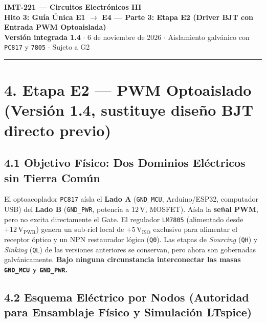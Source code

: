 \documentclass[10pt, a4paper, landscape]{article}
\begin{document}
\noindent
{\LARGE \textbf{\textcolor{ucbblue}{IMT-221 — Circuitos Electrónicos III}}}\\[0.12cm]
{\Large \textbf{Hito 3: Guía Única E1 $\rightarrow$ E4 — Parte 3: Etapa E2 (Driver BJT con Entrada PWM Optoaislada)}}\\[0.08cm]
{\small \textbf{Versión integrada 1.4} $\cdot$ 6 de noviembre de 2026 $\cdot$ Aislamiento galvánico con \texttt{PC817} y \texttt{7805} $\cdot$ Sujeto a G2}
\par\vspace{0.15cm}\noindent\rule{\linewidth}{0.4pt}\vspace{0.2cm}

\section*{4. Etapa E2 — PWM Optoaislado (Versión 1.4, sustituye diseño BJT directo previo)}

\subsection*{4.1 Objetivo Físico: Dos Dominios Eléctricos sin Tierra Común}
El optoacoplador \texttt{PC817} aísla el \textbf{Lado A} (\texttt{GND\_MCU}, Arduino/ESP32, computador USB) del \textbf{Lado B} (\texttt{GND\_PWR}, potencia a $12\,\text{V}$, MOSFET). Aísla la \textbf{señal PWM}, pero no excita directamente el Gate. El regulador \texttt{LM7805} (alimentado desde $+12\,\text{V}_{\text{PWR}}$) genera un sub-riel local de $+5\,\text{V}_{\text{ISO}}$ exclusivo para alimentar el receptor óptico y un NPN restaurador lógico (\texttt{Q0}). Las etapas de \textit{Sourcing} (\texttt{QH}) y \textit{Sinking} (\texttt{QL}) de las versiones anteriores se conservan, pero ahora son gobernadas galvánicamente. \textbf{Bajo ninguna circunstancia interconectar las masas \texttt{GND\_MCU} y \texttt{GND\_PWR}.} 

\subsection*{4.2 Esquema Eléctrico por Nodos (Autoridad para Ensamblaje Físico y Simulación LTspice)}
\end{document}
